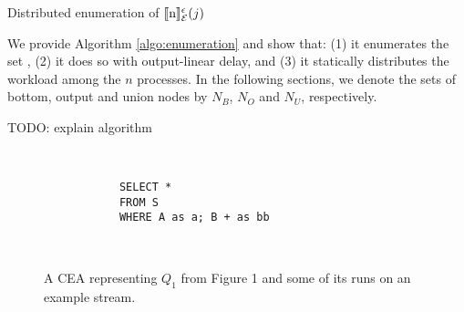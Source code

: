 \begin{algorithm}[H]
  \DontPrintSemicolon
  \SetAlgoNoEnd %
  \SetAlgoNoLine %
\caption{Distributed enumeration of $\llbracket \text{n} \rrbracket^{\epsilon}_{\mathcal{E}}(j)$}
\label{algo:enumeration}
\end{algorithm}

We provide Algorithm \ref{algo:enumeration} and show that: (1) it enumerates the set \enumNode, (2) it does so with output-linear delay, and (3) it statically distributes the workload among the $n$ processes. In the following sections, we denote the sets of bottom, output and union nodes by $N_{B}$, $N_{O}$ and $N_{U}$, respectively.

TODO: explain algorithm

\begin{figure}[H]
  \centering
  \begin{subfigure}[t]{\textwidth}
    \centering
  \end{subfigure}
  \\
  \begin{subfigure}[b]{\textwidth}
    \begin{verbatim}
      SELECT *
      FROM S
      WHERE A as a; B + as bb
    \end{verbatim}
  \end{subfigure}
  \\
  \begin{subfigure}[b]{\textwidth}
    \centering
  \end{subfigure}
  \caption{A CEA representing $Q_{1}$ from Figure 1 and some of its runs on an example stream.}
  \label{fig:label}
\end{figure}

